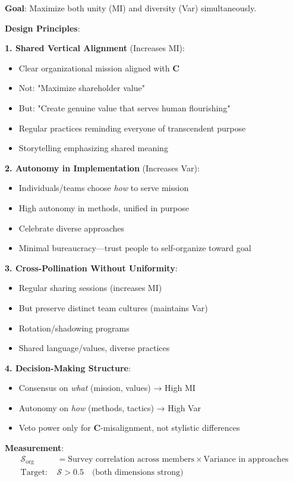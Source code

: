 \documentclass[11pt,a4paper]{article}
\theoremstyle{definition}
\theoremstyle{remark}
\begin{document}
\begin{enumerate}
\begin{protocol}
\textbf{Goal}: Maximize both unity (MI) and diversity (Var) simultaneously.

\textbf{Design Principles}:

\textbf{1. Shared Vertical Alignment} (Increases MI):
\begin{itemize}
    \item Clear organizational mission aligned with \(\mathbf{C}\)
    \item Not: "Maximize shareholder value"
    \item But: "Create genuine value that serves human flourishing"
    \item Regular practices reminding everyone of transcendent purpose
    \item Storytelling emphasizing shared meaning
\end{itemize}

\textbf{2. Autonomy in Implementation} (Increases Var):
\begin{itemize}
    \item Individuals/teams choose \textit{how} to serve mission
    \item High autonomy in methods, unified in purpose
    \item Celebrate diverse approaches
    \item Minimal bureaucracy—trust people to self-organize toward goal
\end{itemize}

\textbf{3. Cross-Pollination Without Uniformity}:
\begin{itemize}
    \item Regular sharing sessions (increases MI)
    \item But preserve distinct team cultures (maintains Var)
    \item Rotation/shadowing programs
    \item Shared language/values, diverse practices
\end{itemize}

\textbf{4. Decision-Making Structure}:
\begin{itemize}
    \item Consensus on \textit{what} (mission, values) → High MI
    \item Autonomy on \textit{how} (methods, tactics) → High Var
    \item Veto power only for \(\mathbf{C}\)-misalignment, not stylistic differences
\end{itemize}

\textbf{Measurement}:
\begin{align}
\mathcal{S}_{\text{org}} &= \text{Survey correlation across members} \times \text{Variance in approaches} \\
\text{Target: } &\mathcal{S} > 0.5 \quad \text{(both dimensions strong)}
\end{align}
\end{protocol}


\end{enumerate}
\end{document}
